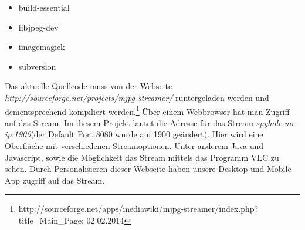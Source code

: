 \begin{itemize}
  \item build-essential
  \item libjpeg-dev
  \item imagemagick
  \item subversion
\end{itemize}

Das aktuelle Quellcode muss von der Webseite \textit{http://sourceforge.net/projects/mjpg-streamer/} runtergeladen werden und dementsprechend kompiliert werden.\footnote{http://sourceforge.net/apps/mediawiki/mjpg-streamer/index.php?title=Main\_Page; 02.02.2014} Über einem Webbrowser hat man Zugriff auf das Stream. Im diesem Projekt lautet die Adresse für das Stream \textit{spyhole.no-ip:1900}(der Default Port 8080 wurde auf 1900 geändert). Hier wird eine Oberfläche mit verschiedenen Streamoptionen. Unter anderem Java und Javascript, sowie die Möglichkeit das Stream mittels das Programm VLC zu sehen. Durch Personalisieren dieser Webseite haben unsere Desktop und Mobile App zugriff auf das Stream.
